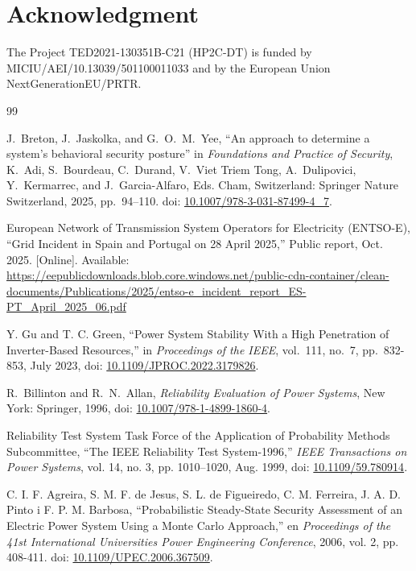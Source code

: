 \documentclass[journal]{IEEEtran}
\begin{document}
\section*{Acknowledgment}
\label{acknowledgement}

The Project TED2021-130351B-C21 (HP2C-DT) is funded by MICIU/AEI/10.13039/501100011033 and by the European Union NextGenerationEU/PRTR.



\begin{thebibliography}{99}

J.~Breton, J.~Jaskolka, and G.~O.~M.~Yee,
``An approach to determine a system's behavioral security posture''
in \emph{Foundations and Practice of Security},
K.~Adi, S.~Bourdeau, C.~Durand, V.~Viet Triem Tong, A.~Dulipovici, 
Y.~Kermarrec, and J.~Garcia-Alfaro, Eds.
Cham, Switzerland: Springer Nature Switzerland, 2025, pp.~94--110.
doi: \href{https://doi.org/10.1007/978-3-031-87499-4_7}{10.1007/978-3-031-87499-4\_7}.

European Network of Transmission System Operators for Electricity (ENTSO-E),
``Grid Incident in Spain and Portugal on 28 April 2025,''
Public report, Oct. 2025.
[Online]. Available:
\url{https://eepublicdownloads.blob.core.windows.net/public-cdn-container/clean-documents/Publications/2025/entso-e_incident_report_ES-PT_April_2025_06.pdf}

Y. Gu and T. C. Green, 
``Power System Stability With a High Penetration of Inverter-Based Resources,'' 
in \emph{Proceedings of the IEEE}, vol.~111, no.~7, pp.~832-853, July 2023, 
doi: \href{https://doi.org/10.1109/JPROC.2022.3179826}{10.1109/JPROC.2022.3179826}.

R.~Billinton and R.~N.~Allan, \emph{Reliability Evaluation of Power Systems}, New York: Springer, 1996,
doi: \href{https://doi.org/10.1007/978-1-4899-1860-4}{10.1007/978-1-4899-1860-4}.

Reliability Test System Task Force of the Application of Probability Methods Subcommittee, ``The IEEE Reliability Test System-1996,'' \emph{IEEE Transactions on Power Systems}, vol. 14, no. 3, pp. 1010--1020, Aug. 1999,
doi: \href{https://doi.org/10.1109/59.780914}{10.1109/59.780914}.

C. I. F. Agreira, S. M. F. de Jesus, S. L. de Figueiredo, C. M. Ferreira, J. A. D. Pinto i F. P. M. Barbosa, 
“Probabilistic Steady-State Security Assessment of an Electric Power System Using a Monte Carlo Approach,” 
en \emph{Proceedings of the 41st International Universities Power Engineering Conference}, 2006, vol. 2, pp. 408-411. 
doi: \href{https://doi.org/10.1109/UPEC.2006.367509}{10.1109/UPEC.2006.367509}.


\end{thebibliography}
\end{document}
